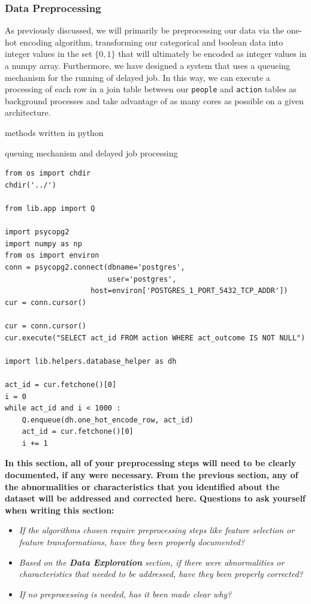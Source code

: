 \documentclass[]{report}
\begin{document}
\subsubsection{Data Preprocessing}\label{data-preprocessing}

As previously discussed, we will primarily be preprocessing our data via
the one-hot encoding algorithm, transforming our categorical and boolean
data into integer values in the set $\{0,1\}$ that will ultimately be
encoded as integer values in a numpy array. Furthermore, we have
designed a system that uses a queueing mechanism for the running of
delayed job. In this way, we can execute a processing of each row in a
join table between our \texttt{people} and \texttt{action} tables as
background processes and take advantage of as many cores as possible on
a given architecture.

methods written in python

queuing mechanism and delayed job processing

\begin{verbatim}
from os import chdir
chdir('../')

from lib.app import Q

import psycopg2
import numpy as np
from os import environ
conn = psycopg2.connect(dbname='postgres', 
                        user='postgres', 
                    host=environ['POSTGRES_1_PORT_5432_TCP_ADDR'])
cur = conn.cursor()

cur = conn.cursor()
cur.execute("SELECT act_id FROM action WHERE act_outcome IS NOT NULL")

import lib.helpers.database_helper as dh

act_id = cur.fetchone()[0]
i = 0
while act_id and i < 1000 :
    Q.enqueue(dh.one_hot_encode_row, act_id)
    act_id = cur.fetchone()[0]
    i += 1
\end{verbatim}

\textbf{In this section, all of your preprocessing steps will need to be
clearly documented, if any were necessary. From the previous section,
any of the abnormalities or characteristics that you identified about
the dataset will be addressed and corrected here. Questions to ask
yourself when writing this section:}

\begin{itemize}
\itemsep1pt\parskip0pt
\item
  \emph{If the algorithms chosen require preprocessing steps like
  feature selection or feature transformations, have they been properly
  documented?}
\item
  \emph{Based on the \textbf{Data Exploration} section, if there were
  abnormalities or characteristics that needed to be addressed, have
  they been properly corrected?}
\item
  \emph{If no preprocessing is needed, has it been made clear why?}
\end{itemize}
\end{document}
